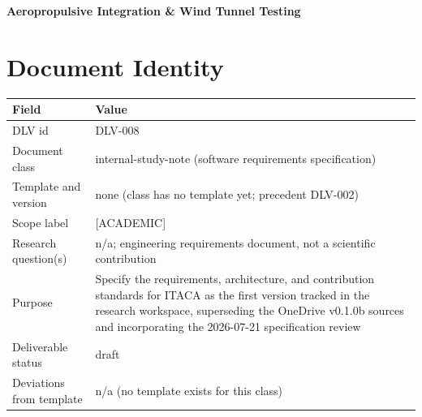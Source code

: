 \documentclass[10pt,letterpaper,oneside]{report}
\begin{document}
\begin{titlepage}
    \vfill
    \large\textbf{Aeropropulsive Integration \& Wind Tunnel Testing}
\end{titlepage}


\section*{Document Identity}

\begin{tabularx}{\textwidth}{@{}lX@{}}
\toprule
\textbf{Field} & \textbf{Value}\\
\midrule
DLV id & DLV-008\\
Document class & internal-study-note (software requirements specification)\\
Template and version & none (class has no template yet; precedent DLV-002)\\
Scope label & [ACADEMIC]\\
Research question(s) & n/a; engineering requirements document, not a scientific contribution\\
Purpose & Specify the requirements, architecture, and contribution standards for ITACA as the first version tracked in the research workspace, superseding the OneDrive v0.1.0b sources and incorporating the 2026-07-21 specification review\\
Deliverable status & draft\\
Deviations from template & n/a (no template exists for this class)\\
\bottomrule
\end{tabularx}
\clearpage



\tableofcontents
\clearpage

\listoffigures
\clearpage
\end{document}
